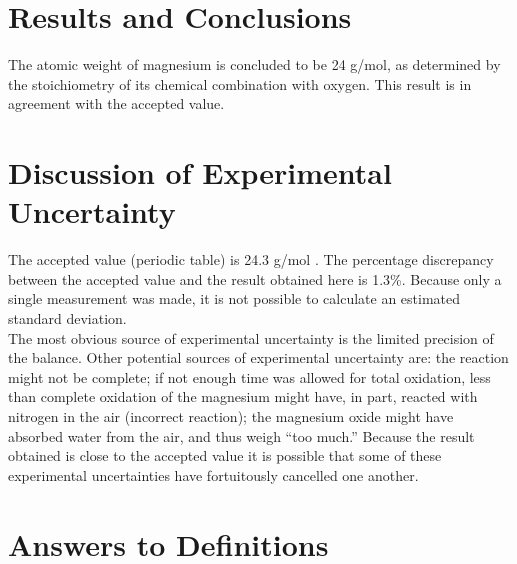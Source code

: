 \documentclass{article}
\begin{document}

\section{Results and Conclusions}

The atomic weight of magnesium is concluded to be 24 g/mol, as determined by the stoichiometry of its chemical combination with oxygen. This result is in agreement with the accepted value.


\section{Discussion of Experimental Uncertainty}

The accepted value (periodic table) is 24.3 g/mol \cite{Smith:2012qr}. The percentage discrepancy between the accepted value and the result obtained here is 1.3\%. Because only a single measurement was made, it is not possible to calculate an estimated standard deviation. \\

The most obvious source of experimental uncertainty is the limited precision of the balance. Other potential sources of experimental uncertainty are: the reaction might not be complete; if not enough time was allowed for total oxidation, less than complete oxidation of the magnesium might have, in part, reacted with nitrogen in the air (incorrect reaction); the magnesium oxide might have absorbed water from the air, and thus weigh ``too much.'' Because the result obtained is close to the accepted value it is possible that some of these experimental uncertainties have fortuitously cancelled one another.


\section{Answers to Definitions}
\end{document}
